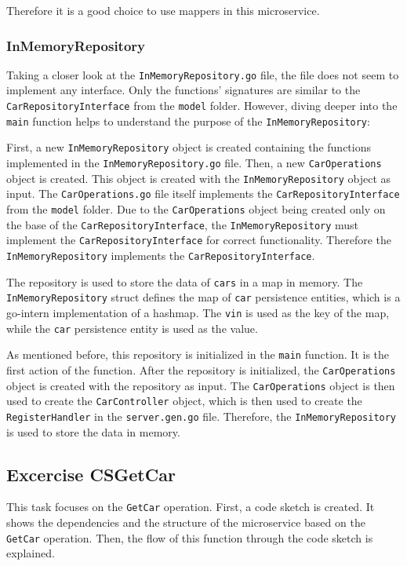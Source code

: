 Therefore it is a good choice to use mappers in this microservice.

\subsubsection*{InMemoryRepository}
Taking a closer look at the \texttt{InMemoryRepository.go} file, the file does not seem to implement any interface.
Only the functions' signatures are similar to the \texttt{CarRepositoryInterface} from the \texttt{model} folder.
However, diving deeper into the \texttt{main} function helps to understand the purpose of the \texttt{InMemoryRepository}:

First, a new \texttt{InMemoryRepository} object is created containing the functions implemented in the \texttt{InMemoryRepository.go} file.
Then, a new \texttt{CarOperations} object is created.
This object is created with the \texttt{InMemoryRepository} object as input.
The \texttt{CarOperations.go} file itself implements the \texttt{CarRepositoryInterface} from the \texttt{model} folder.
Due to the \texttt{CarOperations} object being created only on the base of the \texttt{CarRepositoryInterface}, the \texttt{InMemoryRepository} must implement the \texttt{CarRepositoryInterface} for correct functionality.
Therefore the \texttt{InMemoryRepository} implements the \texttt{CarRepositoryInterface}.

The repository is used to store the data of \texttt{cars} in a map in memory.
The \texttt{InMemoryRepository} struct defines the map of \texttt{car} persistence entities, which is a go-intern implementation of a hashmap.
The \texttt{vin} is used as the key of the map, while the \texttt{car} persistence entity is used as the value.

As mentioned before, this repository is initialized in the \texttt{main} function.
It is the first action of the function.
After the repository is initialized, the \texttt{CarOperations} object is created with the repository as input.
The \texttt{CarOperations} object is then used to create the \texttt{CarController} object, which is then used to create the \texttt{RegisterHandler} in the \texttt{server.gen.go} file.
Therefore, the \texttt{InMemoryRepository} is used to store the data in memory.

\subsection{Excercise CSGetCar}
This task focuses on the \texttt{GetCar} operation.
First, a code sketch is created.
It shows the dependencies and the structure of the microservice based on the \texttt{GetCar} operation.
Then, the flow of this function through the code sketch is explained.

